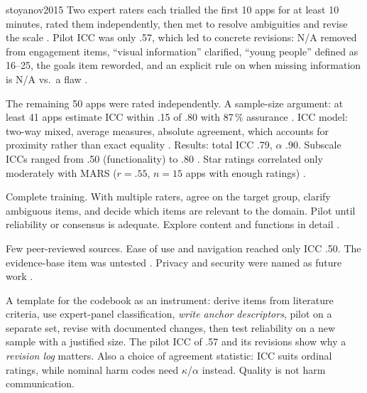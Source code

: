 \begin{papercard}{stoyanov2015}
 Two expert raters each trialled the first 10 apps for at least 10 minutes, rated them independently, then met to resolve ambiguities and revise the scale . Pilot ICC was only .57, which led to concrete revisions: N/A removed from engagement items, ``visual information'' clarified, ``young people'' defined as 16--25, the goals item reworded, and an explicit rule on when missing information is N/A vs.\ a flaw .

 The remaining 50 apps were rated independently. A sample-size argument: at least 41 apps estimate ICC within .15 of .80 with 87\,\% assurance . ICC model: two-way mixed, average measures, absolute agreement, which accounts for proximity rather than exact equality . Results: total ICC .79, $\alpha$ .90. Subscale ICCs ranged from .50 (functionality) to .80 . Star ratings correlated only moderately with MARS ($r=.55$, $n=15$ apps with enough ratings) .

 Complete training. With multiple raters, agree on the target group, clarify ambiguous items, and decide which items are relevant to the domain. Pilot until reliability or consensus is adequate. Explore content and functions in detail .

 Few peer-reviewed sources. Ease of use and navigation reached only ICC .50. The evidence-base item was untested . Privacy and security were named as future work .

 A template for the codebook as an instrument: derive items from literature criteria, use expert-panel classification, \emph{write anchor descriptors}, pilot on a separate set, revise with documented changes, then test reliability on a new sample with a justified size. The pilot ICC of .57 and its revisions show why a \emph{revision log} matters. Also a choice of agreement statistic: ICC suits ordinal ratings, while nominal harm codes need $\kappa$/$\alpha$ instead. Quality is not harm communication.
\end{papercard}


